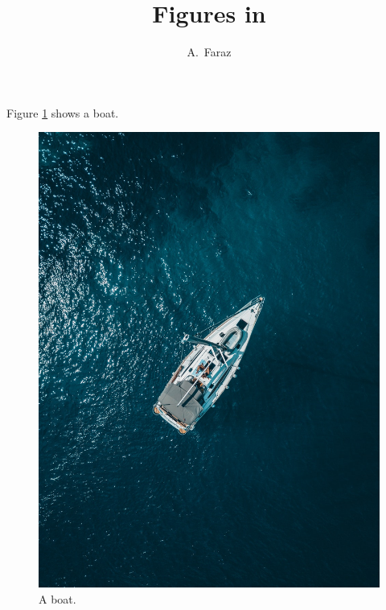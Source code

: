 \documentclass[a4paper,11pt]{article}
\author{A.~Faraz}
\title{Figures in \LaTeXe}
\begin{document}
\maketitle
\pagebreak
Figure \ref{fig:boat1} shows a boat.
	\begin{figure}[h!]
		\centering
		\includegraphics[width=0.5\linewidth]{boat.jpeg}
		\caption{A boat.}
		\label{fig:boat1}
	\end{figure}
\pagebreak
\end{document}
